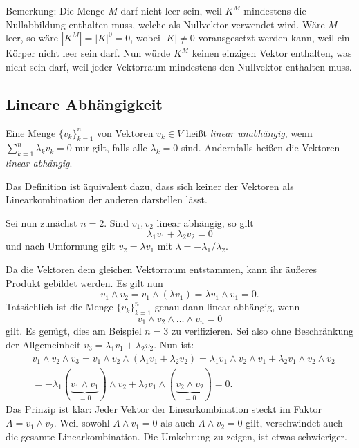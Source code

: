 \documentclass[a4paper,11pt,fleqn,twoside]{scrartcl}
\numberwithin{equation}{section}
\newcommand{\strong}[1]{{\normalfont\sffamily\bfseries #1}}
\newenvironment{Definition}{\par\noindent\strong{Definition.}}{\par}
\begin{document}
Bemerkung: Die Menge $M$ darf nicht leer sein, weil $K^M$ mindestens
die Nullabbildung enthalten muss, welche als Nullvektor verwendet
wird. Wäre $M$ leer, so wäre $|K^M|=|K|^0=0$, wobei $|K|\ne 0$
vorausgesetzt werden kann, weil ein Körper nicht leer sein darf.
Nun würde $K^M$ keinen einzigen Vektor enthalten, was nicht sein darf,
weil jeder Vektorraum mindestens den Nullvektor enthalten muss.

\subsection{Lineare Abhängigkeit}
\begin{Definition}
Eine Menge $\{v_k\}_{k=1}^n$ von Vektoren $v_k\in V$ heißt
\emph{linear unabhängig}, wenn $\sum_{k=1}^n \lambda_k v_k=0$ nur
gilt, falls alle $\lambda_k=0$ sind. Andernfalls heißen die Vektoren
\emph{linear abhängig}.
\end{Definition}

Das Definition ist äquivalent dazu, dass sich keiner der Vektoren
als Linearkombination der anderen darstellen lässt.

Sei nun zunächst $n=2$. Sind $v_1,v_2$ linear abhängig, so gilt
\begin{equation}
\lambda_1 v_1+\lambda_2 v_2 = 0
\end{equation}
und nach Umformung gilt $v_2=\lambda v_1$ mit
$\lambda=-\lambda_1/\lambda_2$.

Da die Vektoren dem gleichen Vektorraum entstammen, kann ihr
äußeres Produkt gebildet werden. Es gilt nun
\begin{equation}
v_1\wedge v_2 = v_1\wedge (\lambda v_1) = \lambda v_1\wedge v_1 = 0.
\end{equation}
Tatsächlich ist die Menge $\{v_k\}_{k=1}^n$ genau dann linear
abhängig, wenn
\begin{equation}
v_1\wedge v_2\wedge\ldots\wedge v_n = 0
\end{equation}
gilt. Es genügt, dies am Beispiel $n=3$ zu verifizieren. Sei also
ohne Beschränkung der Allgemeinheit $v_3=\lambda_1 v_1+\lambda_2 v_2$.
Nun ist:
\begin{align}
&v_1\wedge v_2\wedge v_3
= v_1\wedge v_2\wedge(\lambda_1 v_1+\lambda_2 v_2)
= \lambda_1 v_1\wedge v_2\wedge v_1
+ \lambda_2 v_1\wedge v_2\wedge v_2\\
&= -\lambda_1 (\underbrace{v_1\wedge v_1}_{=0})\wedge v_2
+ \lambda_2 v_1\wedge (\underbrace{v_2\wedge v_2}_{=0})
= 0.
\end{align}
Das Prinzip ist klar: Jeder Vektor der Linearkombination steckt
im Faktor $A=v_1\wedge v_2$. Weil sowohl $A\wedge v_1=0$ als auch
$A\wedge v_2=0$ gilt, verschwindet auch die gesamte Linearkombination.
Die Umkehrung zu zeigen, ist etwas schwieriger.
\end{document}
